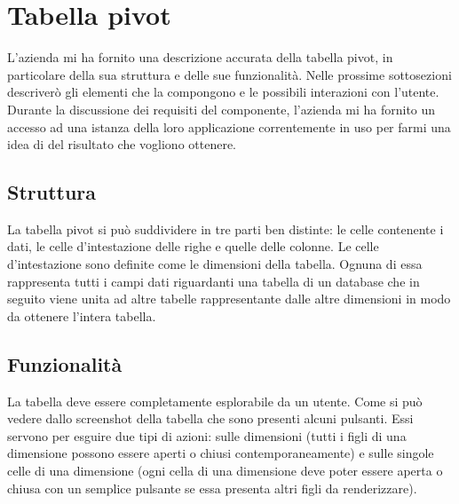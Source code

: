 \section{Tabella pivot}
L'azienda mi ha fornito una descrizione accurata della tabella pivot, in particolare della sua struttura e delle sue funzionalità. Nelle prossime sottosezioni descriverò gli elementi che la compongono e le possibili interazioni con l'utente. Durante la discussione dei requisiti del componente, l'azienda mi ha fornito un accesso ad una istanza della loro applicazione correntemente in uso per farmi una idea di del risultato che vogliono ottenere.
\begin{minipage}{\linewidth}
\end{minipage}

\subsection{Struttura}
La tabella pivot si può suddividere in tre parti ben distinte: le celle contenente i dati, le celle d'intestazione delle righe e quelle delle colonne. 
Le celle d'intestazione sono definite come le dimensioni della tabella. Ognuna di essa rappresenta tutti i campi dati riguardanti una tabella di un database che in seguito viene unita ad altre tabelle rappresentante dalle altre dimensioni in modo da ottenere l'intera tabella.

\subsection{Funzionalità}
La tabella deve essere completamente esplorabile da un utente. Come si può vedere dallo screenshot della tabella che sono presenti alcuni pulsanti. Essi servono per esguire due tipi di azioni: sulle dimensioni (tutti i figli di una dimensione possono essere aperti o chiusi contemporaneamente) e sulle singole celle di una dimensione (ogni cella di una dimensione deve poter essere aperta o chiusa con un semplice pulsante se essa presenta altri figli da renderizzare).

